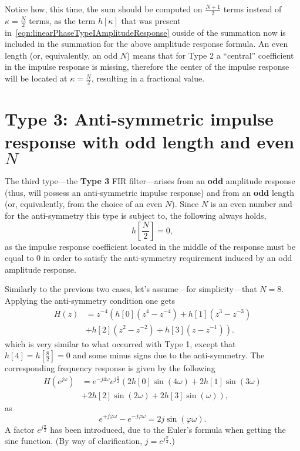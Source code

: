 \documentclass[\documentfontsize, twocolumn]{\classname}
\begin{document}
Notice how, this time, the sum should be computed on $\frac {N+1}{2}$ terms instead of $\kappa = \frac N 2$ terms, as the term $h[\kappa]$ that was present in~\ref{eqn:linearPhaseTypeIAmplitudeResponse} ouside of the summation now is included in the summation for the above amplitude response formula. An even length (or, equivalently, an odd $N$) means that for Type 2 a ``central'' coefficient in the impulse response is missing, therefore the center of the impulse response will be located at $\kappa = \frac N 2$, resulting in a fractional value.


\section{Type 3: Anti-symmetric impulse response with odd length and even $N$}
The third type---the \textbf{Type 3} FIR filter---arises from an \textbf{odd} amplitude response (thus, will possess an anti-symmetric impulse response) and from an \textbf{odd} length (or, equivalently, from the choice of an even $N$). Since $N$ is an even number and for the anti-symmetry this type is subject to, the following always holds,
\begin{equation}\label{eqn:linearPhaseTypeIIIProperty}
    h[\frac N 2] = 0,
\end{equation}
as the impulse response coefficient located in the middle of the response must be equal to $0$ in order to satisfy the anti-symmetry requirement induced by an odd amplitude response.

Similarly to the previous two cases, let's assume---for simplicity---that $N=8$. Applying the anti-symmetry condition one gets
\begin{align*}
    H(z) &= z^{-4}\left(h[0](z^{4} - z^{-4})
         + h[1](z^{3} - z^{-3})\right.\\
         & \left.+ h[2](z^{2} - z^{-2})
         + h[3](z - z^{-1})\right).
\end{align*}
which is very similar to what occurred with Type 1, except that $h[4] = h[\frac 8 2] = 0$ and some minus signs due to the anti-symmetry. The corresponding frequency response is given by the following
\begin{align*}
    H(e^{j\omega}) &= e^{-j 4\omega}e^{j\frac \pi 2}\left(2h[0]\sin{(4\omega)} + 2h[1]\sin{(3\omega)}\right.\\
    & + \left. 2h[2]\sin{(2\omega)} + 2h[3]\sin{(\omega)}\right),
\end{align*}
as
\[
    e^{+j\varphi\omega} - e^{-j\varphi\omega} = 2j\sin{(\varphi \omega)}.
\]
A factor $e^{j\frac \pi 2}$ has been introduced, due to the Euler's formula when getting the sine function. (By way of clarification, $j = e^{j \frac \pi 2}$.)
\end{document}
